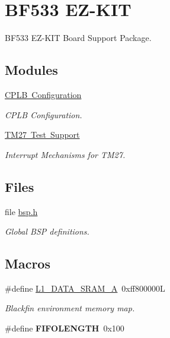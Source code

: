 \hypertarget{group__RTEMSBSPsBfinEZKit533}{}\section{B\+F533 E\+Z-\/\+K\+IT}
\label{group__RTEMSBSPsBfinEZKit533}


B\+F533 E\+Z-\/\+K\+IT Board Support Package.  


\subsection*{Modules}
\begin{DoxyCompactItemize}
\item 
\mbox{\hyperlink{group__ezkit533__cplb}{C\+P\+L\+B Configuration}}
\begin{DoxyCompactList}\small\item\em C\+P\+LB Configuration. \end{DoxyCompactList}\item 
\mbox{\hyperlink{group__ezkit533__tm27}{T\+M27 Test Support}}
\begin{DoxyCompactList}\small\item\em Interrupt Mechanisms for T\+M27. \end{DoxyCompactList}\end{DoxyCompactItemize}
\subsection*{Files}
\begin{DoxyCompactItemize}
\item 
file \mbox{\hyperlink{bsps_2bfin_2eZKit533_2include_2bsp_8h}{bsp.\+h}}
\begin{DoxyCompactList}\small\item\em Global B\+SP definitions. \end{DoxyCompactList}\end{DoxyCompactItemize}
\subsection*{Macros}
\begin{DoxyCompactItemize}
\item 
\mbox{\label{group__RTEMSBSPsBfinEZKit533_ga79efc08b037a52ce2c37deba0f227370}} 
\#define \mbox{\hyperlink{group__RTEMSBSPsBfinEZKit533_ga79efc08b037a52ce2c37deba0f227370}{L1\+\_\+\+D\+A\+T\+A\+\_\+\+S\+R\+A\+M\+\_\+A}}~0xff800000L
\begin{DoxyCompactList}\small\item\em Blackfin environment memory map. \end{DoxyCompactList}\item 
\mbox{\label{group__RTEMSBSPsBfinEZKit533_gacd637fee3c03f7c3835388959b1d54f4}} 
\#define {\bfseries F\+I\+F\+O\+L\+E\+N\+G\+TH}~0x100
\end{DoxyCompactItemize}

